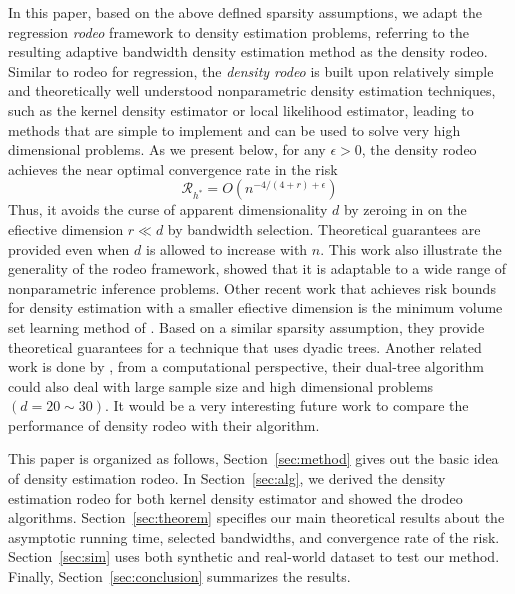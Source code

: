 In this paper, based on the above deflned sparsity assumptions, we adapt the regression \emph{rodeo} framework to density estimation problems, referring to the resulting adaptive bandwidth density estimation method as the density rodeo. 
Similar to rodeo for regression, the \emph{density rodeo} is built upon relatively simple and theoretically well understood nonparametric density estimation techniques, such as the kernel density estimator or local likelihood estimator, leading to methods that are simple to implement and can be used to solve very high dimensional problems. 
As we present below, for any $\epsilon > 0$, the density rodeo achieves the near optimal convergence rate in the risk
\begin{equation}
    \mathcal{R}_{h^{*}}=O\left(n^{-4 /(4+r)+\epsilon}\right)
\end{equation}
Thus, it avoids the curse of apparent dimensionality $d$ by zeroing in on the efiective dimension $r \ll d$ by bandwidth selection. 
Theoretical guarantees are provided even when $d$ is allowed to increase with $n$. 
This work also illustrate the generality of the rodeo framework, showed that it is adaptable to a wide range of nonparametric inference problems. 
Other recent work that achieves risk bounds for density estimation with a smaller efiective dimension is the minimum volume set learning method of \cite{scott2006learning}. 
Based on a similar sparsity assumption, they provide theoretical guarantees for a technique that uses dyadic trees. 
Another related work is done by \cite{gray2003very}, from a computational perspective, their dual-tree algorithm could also deal with large sample size and high dimensional problems $(d = 20 \sim 30)$. It would be a very interesting future work to compare the performance of density rodeo with their algorithm. 


This paper is organized as follows, Section~\ref{sec:method} gives out the basic idea of density estimation rodeo. 
In Section~\ref{sec:alg}, we derived the density estimation rodeo for both kernel density estimator and showed the drodeo algorithms. 
Section~\ref{sec:theorem} specifles our main theoretical results about the asymptotic running time, selected bandwidths, and convergence rate of the risk. 
Section~\ref{sec:sim} uses both synthetic and real-world dataset to test our method. 
Finally, Section~\ref{sec:conclusion} summarizes the results. 
